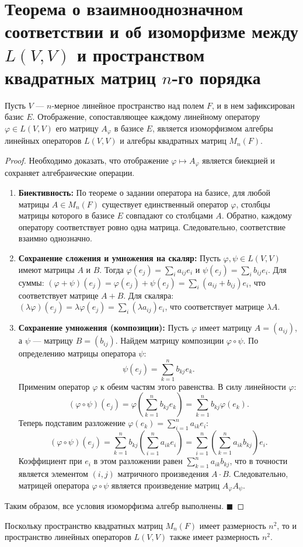 \section{Теорема о взаимнооднозначном соответствии и об изоморфизме между $L(V,V)$ и пространством квадратных матриц $n$-го порядка}

\begin{theorem}
Пусть $V$ --- $n$-мерное линейное пространство над полем $F$, и в нем зафиксирован базис $E$. Отображение, сопоставляющее каждому линейному оператору $\varphi \in L(V, V)$ его матрицу $A_\varphi$ в базисе $E$, является изоморфизмом алгебры линейных операторов $L(V, V)$ и алгебры квадратных матриц $M_n(F)$.
\end{theorem}

\begin{proof}
Необходимо доказать, что отображение $\varphi \mapsto A_\varphi$ является биекцией и сохраняет алгебраические операции.

\begin{enumerate}
    \item \textbf{Биективность:} 
    По теореме о задании оператора на базисе, для любой матрицы $A \in M_n(F)$ существует единственный оператор $\varphi$, столбцы матрицы которого в базисе $E$ совпадают со столбцами $A$. Обратно, каждому оператору соответствует ровно одна матрица. Следовательно, соответствие взаимно однозначно.

    \item \textbf{Сохранение сложения и умножения на скаляр:} 
    Пусть $\varphi, \psi \in L(V, V)$ имеют матрицы $A$ и $B$. Тогда $\varphi(e_j) = \sum_i a_{ij} e_i$ и $\psi(e_j) = \sum_i b_{ij} e_i$. 
    Для суммы: $(\varphi + \psi)(e_j) = \varphi(e_j) + \psi(e_j) = \sum_i (a_{ij} + b_{ij}) e_i$, что соответствует матрице $A + B$.
    Для скаляра: $(\lambda \varphi)(e_j) = \lambda \varphi(e_j) = \sum_i (\lambda a_{ij}) e_i$, что соответствует матрице $\lambda A$.

    \item \textbf{Сохранение умножения (композиции):} 
    Пусть $\varphi$ имеет матрицу $A = (a_{ij})$, а $\psi$ --- матрицу $B = (b_{ij})$. Найдем матрицу композиции $\varphi \circ \psi$. 
    По определению матрицы оператора $\psi$:
    \[
    \psi(e_j) = \sum_{k=1}^n b_{kj} e_k.
    \]
    Применим оператор $\varphi$ к обеим частям этого равенства. В силу линейности $\varphi$:
    \[
    (\varphi \circ \psi)(e_j) = \varphi\left(\sum_{k=1}^n b_{kj} e_k\right) = \sum_{k=1}^n b_{kj} \varphi(e_k).
    \]
    Теперь подставим разложение $\varphi(e_k) = \sum_{i=1}^n a_{ik} e_i$:
    \[
    (\varphi \circ \psi)(e_j) = \sum_{k=1}^n b_{kj} \left( \sum_{i=1}^n a_{ik} e_i \right) = \sum_{i=1}^n \left( \sum_{k=1}^n a_{ik} b_{kj} \right) e_i.
    \]
    Коэффициент при $e_i$ в этом разложении равен $\sum_{k=1}^n a_{ik} b_{kj}$, что в точности является элементом $(i, j)$ матричного произведения $A \cdot B$. Следовательно, матрицей оператора $\varphi \circ \psi$ является произведение матриц $A_\varphi A_\psi$.
\end{enumerate}
Таким образом, все условия изоморфизма алгебр выполнены.
\hfill$\blacksquare$
\end{proof}

\begin{corollary}
Поскольку пространство квадратных матриц $M_n(F)$ имеет размерность $n^2$, то и пространство линейных операторов $L(V, V)$ также имеет размерность $n^2$.
\end{corollary}

